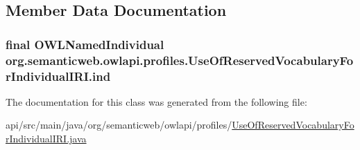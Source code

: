 \subsection{Member Data Documentation}
\hypertarget{classorg_1_1semanticweb_1_1owlapi_1_1profiles_1_1_use_of_reserved_vocabulary_for_individual_i_r_i_ab9cf5090904c7be32b9313f2b6656a92}{
\subsubsection[{ind}]{\setlength{\rightskip}{0pt plus 5cm}final {\bf O\-W\-L\-Named\-Individual} org.\-semanticweb.\-owlapi.\-profiles.\-Use\-Of\-Reserved\-Vocabulary\-For\-Individual\-I\-R\-I.\-ind\hspace{0.3cm}{\ttfamily [private]}}}\label{classorg_1_1semanticweb_1_1owlapi_1_1profiles_1_1_use_of_reserved_vocabulary_for_individual_i_r_i_ab9cf5090904c7be32b9313f2b6656a92}


The documentation for this class was generated from the following file\-:\begin{DoxyCompactItemize}
\item 
api/src/main/java/org/semanticweb/owlapi/profiles/\hyperlink{_use_of_reserved_vocabulary_for_individual_i_r_i_8java}{Use\-Of\-Reserved\-Vocabulary\-For\-Individual\-I\-R\-I.\-java}\end{DoxyCompactItemize}
